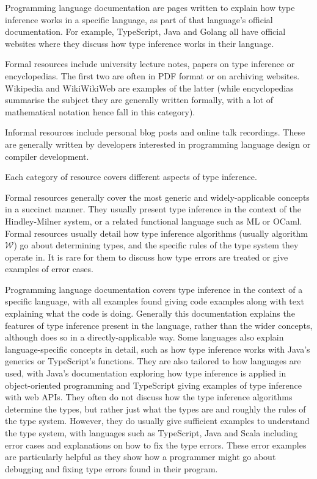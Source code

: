 \documentclass[a4paper,fleqn,oneside,12pt]{report}
\newcommand{\W}{$\mathcal{W}$}
\begin{document}
Programming language documentation are pages written to explain how type inference works in a specific language, as part of that language’s official documentation. For example, TypeScript, Java and Golang all have official websites where they discuss how type inference works in their language.

Formal resources include university lecture notes, papers on type inference or encyclopedias. The first two are often in PDF format or on archiving websites. Wikipedia and WikiWikiWeb are examples of the latter (while encyclopedias summarise the subject they are generally written formally, with a lot of mathematical notation hence fall in this category).

Informal resources include personal blog posts and online talk recordings. These are generally written by developers interested in programming language design or compiler development.

Each category of resource covers different aspects of type inference.

Formal resources generally cover the most generic and widely-applicable concepts in a succinct manner. They usually present type inference in the context of the Hindley-Milner system, or a related functional language such as ML or OCaml. Formal resources usually detail how type inference algorithms (usually algorithm \W) go about determining types, and the specific rules of the type system they operate in. It is rare for them to discuss how type errors are treated or give examples of error cases.

Programming language documentation covers type inference in the context of a specific language, with all examples found giving code examples along with text explaining what the code is doing. Generally this documentation explains the features of type inference present in the language, rather than the wider concepts, although does so in a directly-applicable way. Some languages also explain language-specific concepts in detail, such as how type inference works with Java’s generics or TypeScript’s functions. They are also tailored to how languages are used, with Java’s documentation exploring how type inference is applied in object-oriented programming and TypeScript giving examples of type inference with web APIs. They often do not discuss how the type inference algorithms determine the types, but rather just what the types are and roughly the rules of the type system. However, they do usually give sufficient examples to understand the type system, with languages such as TypeScript, Java and Scala including error cases and explanations on how to fix the type errors. These error examples are particularly helpful as they show how a programmer might go about debugging and fixing type errors found in their program.
\end{document}
